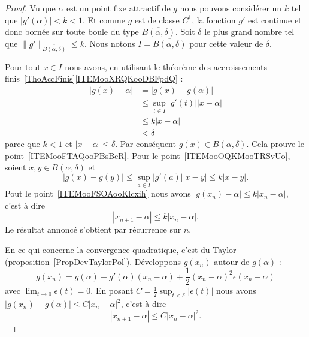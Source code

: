 \begin{proof}
    Vu que \( \alpha\) est un point fixe attractif de \( g\) nous pouvons considérer un \( k\) tel que \( | g'(\alpha) |<k<1\). Et comme \( g\) est de classe \( C^1\), la fonction \( g'\) est continue et donc bornée sur toute boule du type \( \overline{ B(\alpha,\delta) }\). Soit \( \delta\) le plus grand nombre tel que \( \| g' \|_{\overline{ B(\alpha,\delta) }}\leq k\). Nous notons \( I=\overline{ B(\alpha,\delta) } \) pour cette valeur de \( \delta\).

    Pour tout \( x\in I\) nous avons, en utilisant le théorème des accroissements finis~\ref{ThoAccFinis}\ref{ITEMooXRQKooDBFpdQ} :
    \begin{subequations}        \label{SUBEQooYXLHooSCnnRA}
        \begin{align}
            | g(x)-\alpha |&=| g(x)-g(\alpha) |\\
            &\leq\sup_{t\in I}| g'(t) | |x-\alpha |\\
            &\leq k| x-\alpha |\\
            &<\delta
        \end{align}
    \end{subequations}
    parce que \( k<1\) et \(| x-\alpha |\leq \delta\). Par conséquent \( g(x)\in B(\alpha,\delta)\). Cela prouve le point~\ref{ITEMooFTAQooPBsBcR}. Pour le point~\ref{ITEMooOQKMooTRSvUo}, soient \( x,y\in B(\alpha,\delta)\) et
    \begin{equation}
        | g(x)-g(y) |\leq \sup_{a\in I}| g'(a) | |x-y |\leq k| x-y |.
    \end{equation}
    Pout le point~\ref{ITEMooFSOAooKlcxih} nous avons \( | g(x_n)-\alpha |\leq k| x_n-\alpha |\), c'est à dire
    \begin{equation}
        | x_{n+1}-\alpha |\leq k| x_n-\alpha |.
    \end{equation}
    Le résultat annoncé s'obtient par récurrence sur \( n\).

    En ce qui concerne la convergence quadratique, c'est du Taylor (proposition~\ref{PropDevTaylorPol}). Développons \( g(x_n)\) autour de \( g(\alpha)\) :
    \begin{equation}
        g(x_n)=g(\alpha)+g'(\alpha)(x_n-\alpha)+\frac{ 1 }{2}(x_n-\alpha)^2\epsilon(x_n-\alpha)
    \end{equation}
    avec \( \lim_{t\to 0} \epsilon(t)=0\). En posant \( C=\frac{ 1 }{2}\sup_{t<\delta}| \epsilon(t) | \) nous avons $| g(x_n)-g(\alpha) |\leq C|x_n-\alpha  |^2$, c'est à dire
    \begin{equation}
        | x_{n+1}-\alpha |\leq C| x_n-\alpha |^2.
    \end{equation}
\end{proof}

